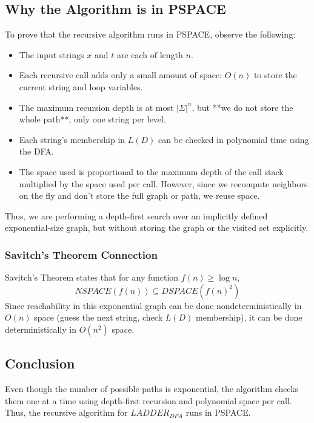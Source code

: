 \subsection*{Why the Algorithm is in PSPACE}

To prove that the recursive algorithm runs in PSPACE, observe the following:

\begin{itemize}
    \item The input strings $x$ and $t$ are each of length $n$.
    \item Each recursive call adds only a small amount of space: $O(n)$ to store the current string and loop variables.
    \item The maximum recursion depth is at most $|\Sigma|^n$, but **we do not store the whole path**, only one string per level.
    \item Each string’s membership in $L(D)$ can be checked in polynomial time using the DFA.
    \item The space used is proportional to the maximum depth of the call stack multiplied by the space used per call. However, since we recompute neighbors on the fly and don’t store the full graph or path, we reuse space.
\end{itemize}

Thus, we are performing a depth-first search over an implicitly defined exponential-size graph, but without storing the graph or the visited set explicitly.

\subsubsection*{Savitch’s Theorem Connection}

Savitch’s Theorem states that for any function $f(n) \ge \log n$,
\[
NSPACE(f(n)) \subseteq DSPACE(f(n)^2)
\]
Since reachability in this exponential graph can be done nondeterministically in $O(n)$ space (guess the next string, check $L(D)$ membership), it can be done deterministically in $O(n^2)$ space.

\subsection*{Conclusion}

Even though the number of possible paths is exponential, the algorithm checks them one at a time using depth-first recursion and polynomial space per call. Thus, the recursive algorithm for $LADDER_{DFA}$ runs in PSPACE.
